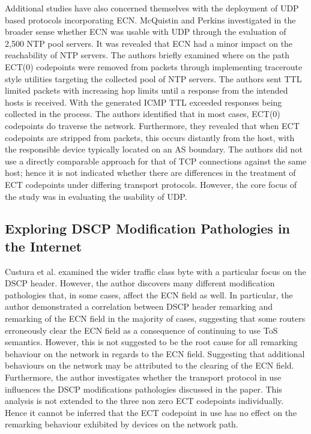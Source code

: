 \documentclass{l4proj}
\begin{document}
Additional studies have also concerned themselves with the deployment of UDP based protocols incorporating ECN. McQuistin and Perkins\cite{mcquistin_is_2015} investigated in the broader sense whether ECN was usable with UDP through the evaluation of 2,500 NTP pool servers. It was revealed that ECN had a minor impact on the reachability of NTP servers. The authors briefly examined where on the path ECT(0) codepoints were removed from packets through implementing traceroute style utilities targeting the collected pool of NTP servers. The authors sent TTL limited packets with increasing hop limits until a response from the intended hosts is received. With the generated ICMP TTL exceeded responses being collected in the process. The authors identified that in most cases, ECT(0) codepoints do traverse the network. Furthermore, they revealed that when ECT codepoints are stripped from packets, this occurs distantly from the host, with the responsible device typically located on an AS boundary. The authors did not use a directly comparable approach for that of TCP connections against the same host; hence it is not indicated whether there are differences in the treatment of ECT codepoints under differing transport protocols. However, the core focus of the study was in evaluating the usability of UDP.

\subsection{Exploring DSCP Modification Pathologies in the Internet}

Custura et al.\cite{custura_exploring_2017} examined the wider traffic class byte with a particular focus on the DSCP header. However, the author discovers many different modification pathologies that, in some cases, affect the ECN field as well. In particular, the author demonstrated a correlation between DSCP header remarking and remarking of the ECN field in the majority of cases, suggesting that some routers erroneously clear the ECN field as a consequence of continuing to use ToS semantics. However, this is not suggested to be the root cause for all remarking behaviour on the network in regards to the ECN field. Suggesting that additional behaviours on the network may be attributed to the clearing of the ECN field. Furthermore, the author investigates whether the transport protocol in use influences the DSCP modifications pathologies discussed in the paper. This analysis is not extended to the three non zero ECT codepoints individually. Hence it cannot be inferred that the ECT codepoint in use has no effect on the remarking behaviour exhibited by devices on the network path.
\end{document}
